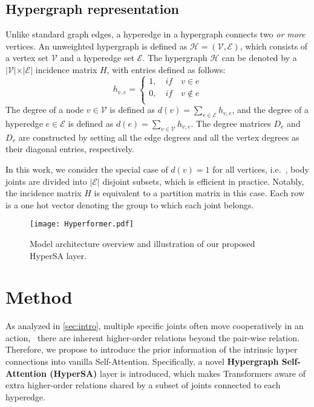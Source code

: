 \documentclass[10pt,twocolumn,letterpaper]{article}
\begin{document}
\subsection{Hypergraph representation}

Unlike standard graph edges, a hyperedge in a hypergraph connects
two \emph{or more} vertices. An unweighted hypergraph is defined as $\mathcal{H} =
(\mathcal{V}, \mathcal{E})$, which consists of a vertex set $\mathcal{V}$ and a hyperedge set $\mathcal{E}$. The hypergraph $\mathcal{H}$ can be denoted by a $\vert \mathcal{V} \vert \times \vert \mathcal{E} \vert $ incidence matrix $H$, with entries defined as follows:
\begin{equation}
\label{eq:3}
h_{v, e}=\left\{
	\begin{aligned}
	1, \quad if \quad v \in e\\
	0, \quad if \quad v \notin e\\
	\end{aligned}\right
	.
\end{equation}
The degree of a node $ v \in \mathcal{V}$ is defined as $ d(v) =
\sum_{e \in \mathcal{E}} h_{v, e}$, and the degree of a hyperedge $e \in \mathcal{E}$ is defined
as $d(e) = \sum_{v \in \mathcal{V}} h_{v, e}$. The degree matrices $D_e$ and $D_v$ are constructed by setting all the edge degrees and all the vertex degrees as their diagonal entries,
respectively.

In this work, we consider the special case of $d(v)=1$ for all vertices, i.e.~, body joints are divided into $\vert \mathcal{E} \vert$ disjoint subsets, which is efficient in practice. Notably, the incidence matrix $H$ is equivalent to a partition matrix in this case.
Each row is a one hot vector denoting the group to which each joint belongs.





\begin{figure*}[ht]
  \centering

      \texttt{[image: Hyperformer.pdf]}
     \caption{Model architecture overview and illustration of our proposed HyperSA layer.}
     \label{fig:model}
\end{figure*}


\section{Method}
As analyzed in \cref{sec:intro}, multiple specific joints often move cooperatively in an action, \ie~there are inherent higher-order relations beyond the pair-wise relation. Therefore, we propose to introduce the prior information of the intrinsic hyper connections into vanilla Self-Attention. Specifically, a novel \textbf{Hypergraph Self-Attention (HyperSA)} layer is introduced, which makes Transformers aware of extra higher-order relations shared by a subset of joints connected to each hyperedge. 
\end{document}
